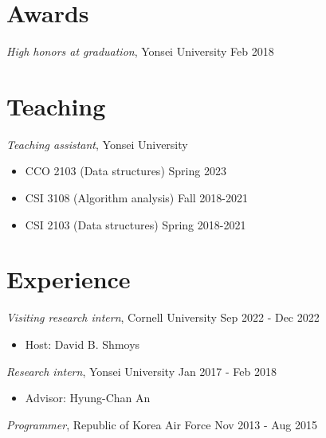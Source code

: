 \documentclass[margin, 10pt]{res} %
\begin{document}
\begin{resume}

\section{Awards}
\textsl{High honors at graduation}, Yonsei University \hfill Feb 2018

\section{Teaching}
\textsl{Teaching assistant}, Yonsei University
\begin{itemize} \itemsep -2pt %
\item[] CCO 2103 (Data structures) \hfill Spring 2023
\item[] CSI 3108 (Algorithm analysis) \hfill Fall 2018-2021
\item[] CSI 2103 (Data structures) \hfill Spring 2018-2021
\end{itemize}

\section{Experience}
\textsl{Visiting research intern}, Cornell University \hfill Sep 2022 - Dec 2022
\begin{itemize} \itemsep -2pt %
\item[] Host: David B. Shmoys
\end{itemize}

\textsl{Research intern}, Yonsei University \hfill Jan 2017 - Feb 2018
\begin{itemize} \itemsep -2pt %
\item[] Advisor: Hyung-Chan An
\end{itemize}

\textsl{Programmer}, Republic of Korea Air Force \hfill Nov 2013 - Aug 2015




\end{resume}
\end{document}
